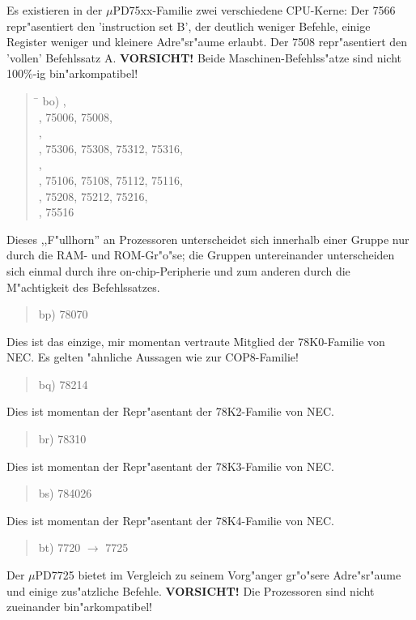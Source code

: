 \documentclass[12pt,a4paper,twoside]{report}
\begin{document}
Es existieren in der $\mu$PD75xx-Familie zwei verschiedene
CPU-Kerne: Der 7566 repr"asentiert den 'instruction set B', der
deutlich weniger Befehle, einige Register weniger und kleinere
Adre"sr"aume erlaubt.  Der 7508 repr"asentiert den 'vollen'
Befehlssatz A.  {\bf VORSICHT!} Beide Maschinen-Befehlss"atze
sind nicht 100\%-ig bin"arkompatibel!
\begin{quote}
\begin{tabbing}
\hspace{0.7cm} \= \kill
bo) , \\
    , 75006, 75008, \\
    , \\
    , 75306, 75308, 75312, 75316, \\
    , \\
    , 75106, 75108, 75112, 75116, \\
    , 75208, 75212, 75216, \\
    , 75516 \\
\end{tabbing}
\end{quote}
Dieses ,,F"ullhorn'' an Prozessoren unterscheidet sich innerhalb einer
Gruppe nur durch die RAM- und ROM-Gr"o"se; die Gruppen untereinander
unterscheiden sich einmal durch ihre on-chip-Peripherie und
zum anderen durch die M"achtigkeit des Befehlssatzes.
\begin{quote}
bp) 78070
\end{quote}
Dies ist das einzige, mir momentan vertraute Mitglied der
78K0-Familie von NEC.  Es gelten "ahnliche Aussagen wie zur
COP8-Familie!
\begin{quote}
bq) 78214
\end{quote}
Dies ist momentan der Repr"asentant der 78K2-Familie von NEC.
\begin{quote}
br) 78310
\end{quote}
Dies ist momentan der Repr"asentant der 78K3-Familie von NEC.
\begin{quote}
bs) 784026
\end{quote}
Dies ist momentan der Repr"asentant der 78K4-Familie von NEC.
\begin{quote}
bt) 7720 $\rightarrow$ 7725
\end{quote}
Der $\mu$PD7725 bietet im Vergleich zu seinem Vorg"anger gr"o"sere
Adre"sr"aume und einige zus"atzliche Befehle. {\bf VORSICHT!}  Die
Prozessoren sind nicht zueinander bin"arkompatibel!
\end{document}
